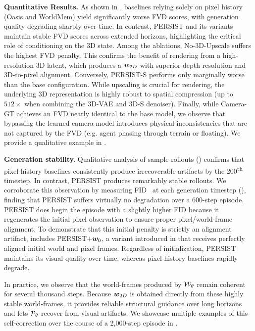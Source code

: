\documentclass{article}
\theoremstyle{plain}
\theoremstyle{definition}
\theoremstyle{remark}
\begin{document}
\textbf{Quantitative Results.} As shown in , baselines relying solely on pixel history (Oasis and WorldMem) yield significantly worse FVD scores, with generation quality degrading sharply over time. In contrast, PERSIST and its variants maintain stable FVD scores across extended horizons, highlighting the critical role of conditioning on the 3D state. Among the ablations, No-3D-Upscale suffers the highest FVD penalty. This confirms the benefit of rendering from a high-resolution 3D latent, which produces a ${\bm{w}}_{2D}$ with superior depth resolution and 3D-to-pixel alignment. Conversely, PERSIST-S performs only marginally worse than the base configuration. While upscaling is crucial for rendering, the underlying 3D representation is highly robust to spatial compression (up to $512\times$ when combining the 3D-VAE and 3D-S denoiser). Finally, while Camera-GT achieves an FVD nearly identical to the base model, we observe that bypassing the learned camera model introduces physical inconsistencies that are not captured by the FVD (e.g. agent phasing through terrain or floating). We provide a qualitative example in .

\textbf{Generation stability.} Qualitative analysis of sample rollouts () confirms that pixel-history baselines consistently produce irrecoverable artifacts by the 200\textsuperscript{th} timestep. In contrast, PERSIST produces remarkably stable rollouts. We corroborate this observation by measuring FID~\citep{heusel2017gans} at each generation timestep (), finding that PERSIST suffers virtually no degradation over a 600-step episode. PERSIST does begin the episode with a slightly higher FID because it regenerates the initial pixel observation to ensure proper pixel/world-frame alignment. To demonstrate that this initial penalty is strictly an alignment artifact,  includes PERSIST$+{\bm{w}}_0$, a variant introduced in  that receives perfectly aligned initial world and pixel frames. Regardless of initialization, PERSIST maintains its visual quality over time, whereas pixel-history baselines rapidly degrade.

In practice, we observe that the world-frames produced by ${\mathcal{W}}_\theta$ remain coherent for several thousand steps. Because ${\bm{w}}_{2D}$ is obtained directly from these highly stable world-frames, it provides reliable structural guidance over long horizons and lets ${\mathcal{P}}_\theta$ recover from visual artifacts. We showcase multiple examples of this self-correction over the course of a 2,000-step episode in .
\end{document}
